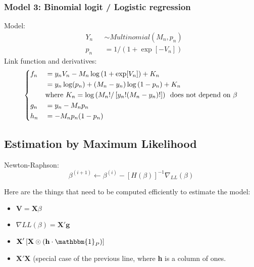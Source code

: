 \documentclass[12pt]{article}
\begin{document}
\subsubsection{Model 3: Binomial logit / Logistic regression}
Model:
\begin{equation}
\begin{aligned}
	& Y_n && \sim Multinomial(M_n, p_n) \\
	& p_n && = 1 / \left( 1 + \exp[-V_n] \right)
\end{aligned}
\end{equation}
Link function and derivatives:
\begin{equation}
\left\{ \begin{aligned}
	& f_n && =  y_n V_n - M_n \log\left( 1 + \exp[V_n] \right) + K_n \\
	&  && =  y_n \log(p_n) + (M_n - y_n) \log\left( 1 - p_n \right) + K_n \\
		& && \text{where } K_n = \log\left( M_n ! / \left[ y_n ! (M_n - y_n)! \right] \right) \hspace*{5pt} \text{does not depend on } \beta \\
	& g_n && =  y_n - M_n p_n \\
	& h_n && =  - M_n p_n (1-p_n) \\
\end{aligned} \right.
\end{equation}


\subsection{Estimation by Maximum Likelihood}
Newton-Raphson:
\begin{equation}
	\beta^{(i+1)} \leftarrow \beta^{(i)} - \left[H(\beta)\right]^{-1} \nabla_{LL}(\beta)
\end{equation}

Here are the things that need to be computed efficiently to estimate the model:
\begin{itemize}
	\item $\textbf{V} = \textbf{X} \beta $
	\item $\nabla LL(\beta) = \textbf{X}' \textbf{g}$
	\item $\textbf{X}' \left[ \textbf{X} \odot \left(\textbf{h} \cdot \mathbbm{1}_P \right) \right]$
	\item $\textbf{X}' \textbf{X} $ (special case of the previous line, where \textbf{h} is a column of ones.
\end{itemize}
\end{document}
